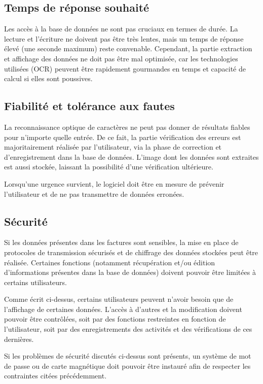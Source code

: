 \subsection{Temps de réponse souhaité}
Les accès à la base de données ne sont pas cruciaux en termes de durée. La lecture et l’écriture ne doivent pas être très lentes, mais un temps de réponse élevé (une seconde 
maximum) reste convenable. Cependant, la partie extraction et affichage des données ne 
doit pas être mal optimisée, car les technologies utilisées (OCR) peuvent être rapidement gourmandes en temps et capacité de calcul si elles sont poussives.

\subsection{Fiabilité et tolérance aux fautes}
La reconnaissance optique de caractères ne peut pas donner de résultats fiables pour n’importe quelle entrée. De ce fait, la partie vérification des erreurs est majoritairement réalisée par l’utilisateur, via la phase de correction et d’enregistrement dans la base de données. L’image dont les données sont extraites est aussi stockée, laissant la possibilité d’une vérification ultérieure.

Lorsqu’une urgence survient, le logiciel doit être en mesure de prévenir l’utilisateur et de ne pas transmettre de données erronées. 

\subsection{Sécurité}
Si les données présentes dans les factures sont sensibles, la mise en place de protocoles de transmission sécurisés et de chiffrage des données stockées peut être réalisée.
Certaines fonctions (notamment récupération et/ou édition d’informations présentes dans la base de données) doivent pouvoir être limitées à certains utilisateurs.

Comme écrit ci-dessus, certains utilisateurs peuvent n’avoir besoin que de l’affichage de certaines données. L’accès à d’autres et la modification doivent pouvoir être contrôlées, soit par des fonctions restreintes en fonction de l'utilisateur, soit par des enregistrements des activités et des vérifications de ces dernières.

Si les problèmes de sécurité discutés ci-dessus sont présents, un système de mot de passe ou de carte magnétique doit pouvoir être instauré afin de respecter les contraintes citées précédemment.

